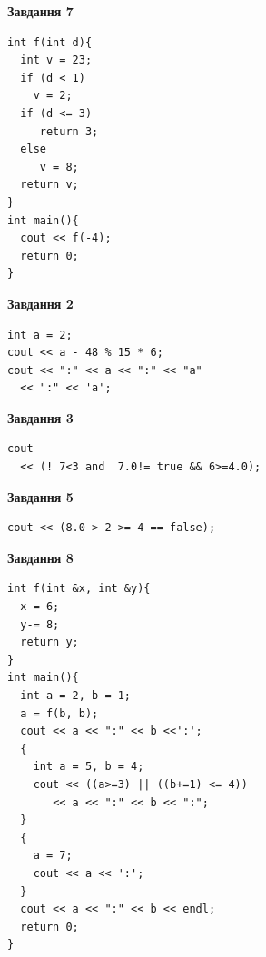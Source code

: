 \documentclass[12pt, ukrainian]{article}
\begin{document}
{\begin {large}
\begin{minipage}[t]{7.0cm}
\begin{center}
\textbf{Завдання 7}
\end{center}
\vspace{-8mm}

\begin{verbatim}
int f(int d){
  int v = 23;
  if (d < 1)
    v = 2;
  if (d <= 3)
     return 3;
  else
     v = 8;
  return v;
}
int main(){
  cout << f(-4);
  return 0;
}
\end{verbatim}

\end{minipage}
\vline \hspace{1mm}
\begin{minipage}[t]{11.0cm}

\begin{center}
\textbf{Завдання 2}
\end{center}
\vspace{-8mm}

\begin{verbatim}
int a = 2;
cout << a - 48 % 15 * 6;
cout << ":" << a << ":" << "a" 
  << ":" << 'a';
\end{verbatim}



\begin{center}
\textbf{Завдання 3}
\end{center}
\vspace{-8mm}

\begin{verbatim}
cout 
  << (! 7<3 and  7.0!= true && 6>=4.0);
\end{verbatim}



\begin{center}
\textbf{Завдання 5}
\end{center}
\vspace{-8mm}

\begin{verbatim}
cout << (8.0 > 2 >= 4 == false);
\end{verbatim}



\begin{center}
\textbf{Завдання 8}
\end{center}
\vspace{-8mm}

\begin{verbatim}
int f(int &x, int &y){
  x = 6;
  y-= 8;
  return y;
}
int main(){
  int a = 2, b = 1;
  a = f(b, b);
  cout << a << ":" << b <<':';
  {
    int a = 5, b = 4;
    cout << ((a>=3) || ((b+=1) <= 4))
       << a << ":" << b << ":";
  }
  {
    a = 7;
    cout << a << ':';
  }
  cout << a << ":" << b << endl;
  return 0;
}
\end{verbatim}


\end{minipage}
\end{large}}
\end{document}
